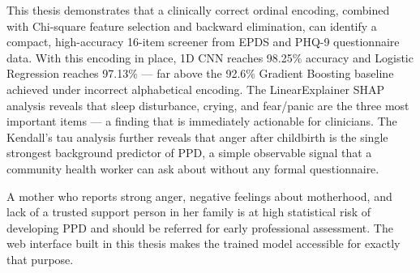 This thesis demonstrates that a clinically correct ordinal encoding, combined with Chi-square feature selection and backward elimination, can identify a compact, high-accuracy 16-item screener from EPDS and PHQ-9 questionnaire data.
With this encoding in place, 1D CNN reaches 98.25\% accuracy and Logistic Regression reaches 97.13\% --- far above the 92.6\% Gradient Boosting baseline achieved under incorrect alphabetical encoding.
The LinearExplainer SHAP analysis reveals that sleep disturbance, crying, and fear/panic are the three most important items --- a finding that is immediately actionable for clinicians.
The Kendall's tau analysis further reveals that anger after childbirth is the single strongest background predictor of PPD, a simple observable signal that a community health worker can ask about without any formal questionnaire.

A mother who reports strong anger, negative feelings about motherhood, and lack of a trusted support person in her family is at high statistical risk of developing PPD and should be referred for early professional assessment.
The web interface built in this thesis makes the trained model accessible for exactly that purpose.
